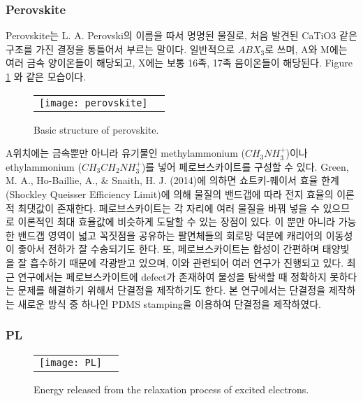 \subsubsection{Perovskite}
Perovskite는 L. A. Perovski의 이름을 따서 명명된 물질로, 처음 발견된 CaTiO3  같은 구조를 가진 결정을 통틀어서 부르는 말이다. 일반적으로 $ABX_3$로 쓰며, A와 M에는 여러 금속 양이온들이 해당되고, X에는 보통 16족, 17족 음이온들이 해당된다. Figure \ref{fig:perov} 와 같은 모습이다.
\begin{figure}[H]
	\begin{center}
		\begin{tabular}{cc}
			\texttt{[image: perovskite]}
		\end{tabular}
	\end{center}
	\caption{Basic structure of perovskite.}
	\label{fig:perov} 
\end{figure}
A위치에는 금속뿐만 아니라 유기물인  methylammonium ($CH_3NH_3^+$)이나 ethylammonium ($CH_3CH_2NH_3^+$)를 넣어 페로브스카이트를 구성할 수 있다. Green, M. A., Ho-Baillie, A., \& Snaith, H. J. (2014)에 의하면 쇼트키-퀘이서 효율 한계(Shockley Queisser Efficiency Limit)에 의해 물질의 밴드갭에 따라 전지 효율의 이론적 최댓값이 존재한다\cite{green2014emergence}. 페로브스카이트는 각 자리에 여러 물질을 바꿔 넣을 수 있으므로 이론적인 최대 효율값에 비슷하게 도달할 수  있는 장점이 있다. 이 뿐만 아니라 가능한 밴드갭 영역이 넓고 꼭짓점을 공유하는 팔면체들의 회로망 덕분에 캐리어의 이동성이 좋아서 전하가 잘 수송되기도 한다\cite{green2014emergence}.
또, 페로브스카이트는 합성이 간편하며 태양빛을 잘 흡수하기 때문에 각광받고 있으며, 이와 관련되어 여러 연구가 진행되고 있다. 최근 연구에서는 페로브스카이트에 defect가 존재하여 물성을 탐색할 때 정확하지 못하다는 문제를 해결하기 위해서 단결정을 제작하기도 한다. 본 연구에서는 단결정을 제작하는 새로운 방식 중 하나인 PDMS stamping을 이용하여 단결정을 제작하였다.


\subsubsection{PL}

\begin{figure}[H]
	\begin{center}
		\begin{tabular}{cc}
			\texttt{[image: PL]}
		\end{tabular}
	\end{center}
	\caption{Energy released from the relaxation process of excited electrons.}
	\label{fig:pl} 
\end{figure}

